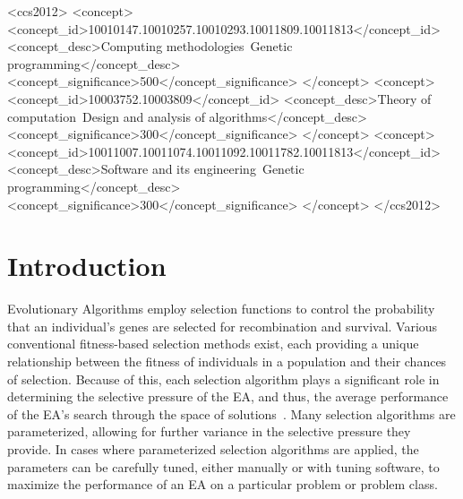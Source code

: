 \documentclass[sigconf]{acmart}
\begin{document}
\begin{CCSXML}
<ccs2012>
<concept>
<concept_id>10010147.10010257.10010293.10011809.10011813</concept_id>
<concept_desc>Computing methodologies~Genetic programming</concept_desc>
<concept_significance>500</concept_significance>
</concept>
<concept>
<concept_id>10003752.10003809</concept_id>
<concept_desc>Theory of computation~Design and analysis of algorithms</concept_desc>
<concept_significance>300</concept_significance>
</concept>
<concept>
<concept_id>10011007.10011074.10011092.10011782.10011813</concept_id>
<concept_desc>Software and its engineering~Genetic programming</concept_desc>
<concept_significance>300</concept_significance>
</concept>
</ccs2012>
\end{CCSXML}




\maketitle

\section{Introduction}
\label{Introduction}

Evolutionary Algorithms employ selection functions to control the probability that an individual's genes are selected for recombination and survival. Various conventional fitness-based selection methods exist, each providing a unique relationship between the fitness of individuals in a population and their chances of selection. Because of this, each selection algorithm plays a significant role in determining the selective pressure of the EA, and thus, the average performance of the EA's search through the space of solutions~\cite{woodward2010metaBias}. Many selection algorithms are parameterized, allowing for further variance in the selective pressure they provide. In cases where parameterized selection algorithms are applied, the parameters can be carefully tuned, either manually or with tuning software, to maximize the performance of an EA on a particular problem or problem class.
\end{document}
